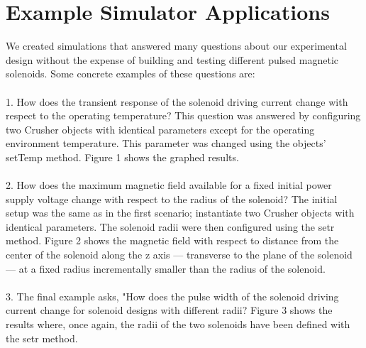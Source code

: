 \documentclass[prb,preprint]{revtex4-1}
\begin{document}
\section{Example Simulator Applications}
We created simulations that answered many questions about our experimental design without the expense of building and testing different pulsed magnetic solenoids.  Some concrete examples of these questions are: 
\\
\\
1.  How does the transient response of the solenoid driving current change with respect to the operating temperature? This question was answered by configuring two Crusher objects with identical parameters except for the operating environment temperature.  This parameter was changed using the objects' setTemp method.  Figure 1 shows the graphed results.
\\
\\
2.  How does the maximum magnetic field available for a fixed initial power supply voltage change with respect to the radius of the solenoid? The initial setup was the same as in the first scenario; instantiate two Crusher objects with identical parameters.  The solenoid radii were then configured using the setr method.  Figure 2 shows the magnetic field with respect to distance from the center of the solenoid along the z axis --- transverse to the plane of the solenoid --- at a fixed radius incrementally smaller than the radius of the solenoid. 
\\
\\
3.  The final example asks, "How does the pulse width  of the solenoid driving current change for solenoid designs with different radii? Figure 3 shows the results where, once again, the radii of the two solenoids have been defined with the setr method. 
\\
\\
\end{document}
